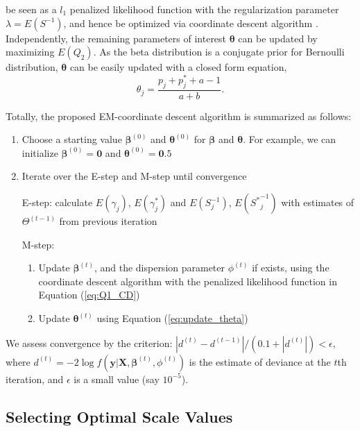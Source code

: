 \documentclass[AMA,STIX1COL,]{WileyNJD-v2}
\begin{document}
be seen as a \(l_1\) penalized likelihood function with the
regularization parameter \(\lambda = E(S^{-1})\), and hence be optimized
via coordinate descent algorithm \citep{Friedman2010}. Independently,
the remaining parameters of interest \(\boldsymbol{\theta}\) can be
updated by maximizing \(E(Q_2)\). As the beta distribution is a
conjugate prior for Bernoulli distribution, \(\boldsymbol{\theta}\) can
be easily updated with a closed form equation,
\begin{equation}\label{eq:update_theta}
\theta_j = \frac{p_j + p^*_{j} + a - 1 }{a + b}.
\end{equation}

Totally, the proposed EM-coordinate descent algorithm is summarized as
follows:

\begin{enumerate}
\def\labelenumi{\arabic{enumi})}
\item
  Choose a starting value \(\boldsymbol{\beta}^{(0)}\) and
  \(\boldsymbol{\theta}^{(0)}\) for \(\boldsymbol{\beta}\) and
  \(\boldsymbol{\theta}\). For example, we can initialize
  \(\boldsymbol{\beta}^{(0)} = \boldsymbol{0}\) and
  \(\boldsymbol{\theta}^{(0)} = \boldsymbol{0}.5\)
\item
  Iterate over the E-step and M-step until convergence

  E-step: calculate \(E(\gamma_{j})\), \(E(\gamma^*_{j})\) and
  \(E({S}^{-1}_{j})\), \(E({S^*}^{-1}_{j})\) with estimates of
  \(\Theta^{(t-1)}\) from previous iteration

  M-step:

  \begin{enumerate}
  \def\labelenumii{\alph{enumii})}
  \item
    Update \(\boldsymbol{\beta}^{(t)}\), and the dispersion parameter
    \(\phi^{(t)}\) if exists, using the coordinate descent algorithm
    with the penalized likelihood function in Equation (\ref{eq:Q1_CD})
  \item
    Update \(\boldsymbol{\theta}^{(t)}\) using Equation
    (\ref{eq:update_theta})
  \end{enumerate}
\end{enumerate}

We assess convergence by the criterion:
\(|d^{(t)}-d^{(t-1)}|/(0.1+|d^{(t)}|)<\epsilon\), where
\(d^{(t)} = -2\log f(\textbf{y}| \textbf{X}, \boldsymbol{\beta}^{(t)},\phi^{(t)})\)
is the estimate of deviance at the \(t\)th iteration, and \(\epsilon\)
is a small value (say \(10^{-5}\)).

\subsection{Selecting Optimal Scale Values}
\label{sec:tune}
\end{document}
